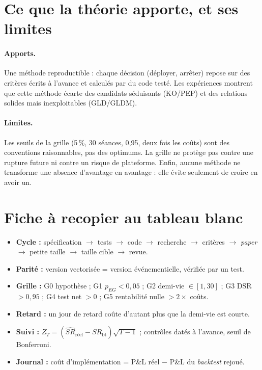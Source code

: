 \section{Ce que la théorie apporte, et ses limites}

\paragraph{Apports.} Une méthode reproductible : chaque décision (déployer, arrêter) repose sur des critères écrits à l'avance et calculés par du code testé. Les expériences montrent que cette méthode écarte des candidats séduisants (KO/PEP) et des relations solides mais inexploitables (GLD/GLDM).

\paragraph{Limites.} Les seuils de la grille (5\,\%, 30 séances, 0,95, deux fois les coûts) sont des conventions raisonnables, pas des optimums. La grille ne protège pas contre une rupture future ni contre un risque de plateforme. Enfin, aucune méthode ne transforme une absence d'avantage en avantage : elle évite seulement de croire en avoir un.

\section{Fiche à recopier au tableau blanc}

\begin{whiteboard}
\begin{itemize}[leftmargin=1.2em]
\item \textbf{Cycle :} spécification $\to$ tests $\to$ code $\to$ recherche $\to$ critères $\to$ \emph{paper} $\to$ petite taille $\to$ taille cible $\to$ revue.
\item \textbf{Parité :} version vectorisée = version événementielle, vérifiée par un test.
\item \textbf{Grille :} G0 hypothèse ; G1 $p_{EG}<0{,}05$ ; G2 demi-vie $\in[1,30]$ ; G3 DSR $>0{,}95$ ; G4 test net $>0$ ; G5 rentabilité nulle $> 2\times$ coûts.
\item \textbf{Retard :} un jour de retard coûte d'autant plus que la demi-vie est courte.
\item \textbf{Suivi :} $Z_T = (\widehat{SR}_{\text{réel}} - SR_{\text{bt}})\sqrt{T-1}$ ; contrôles datés à l'avance, seuil de Bonferroni.
\item \textbf{Journal :} coût d'implémentation = P\&L réel $-$ P\&L du \emph{backtest} rejoué.
\end{itemize}
\end{whiteboard}

